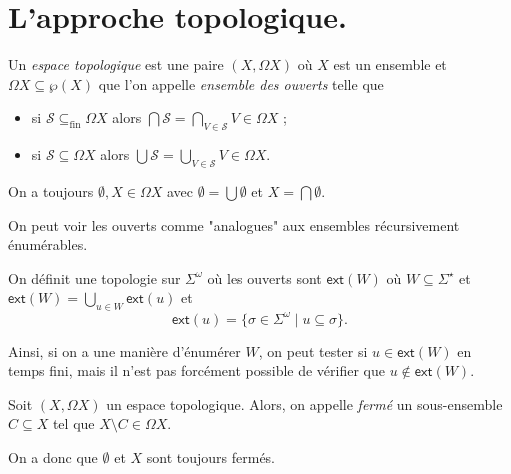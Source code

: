 \documentclass[./main]{subfiles}
\begin{document}
  \chapter{L'approche topologique.}

  \begin{defn}
    Un \textit{espace topologique} est une paire $(X, \Omega X)$ où $X$ est un ensemble et $\Omega X \subseteq \wp(X)$ que l'on appelle \textit{ensemble des ouverts} telle que
    \begin{itemize}
      \item si $\mathcal{S} \subseteq_\mathrm{fin} \Omega X$ alors $\bigcap \mathcal{S} = \bigcap_{V \in \mathcal{S}} V \in \Omega X$ ;
      \item si $\mathcal{S} \subseteq \Omega X$ alors $\bigcup \mathcal{S} = \bigcup_{V \in \mathcal{S}} V \in \Omega X$.
    \end{itemize}
  \end{defn}

  \begin{rmk}
    On a toujours $\emptyset, X \in \Omega X$ avec $\emptyset = \bigcup \emptyset$ et $X = \bigcap \emptyset$.
  \end{rmk}

  \begin{exm}
    On peut voir les ouverts comme "analogues" aux ensembles récursivement énumérables.

    On définit une topologie  sur $\Sigma^\omega$ où les ouverts sont  $\mathsf{ext}(W)$ où $W \subseteq \Sigma^\star$ et $\mathsf{ext}(W) = \bigcup_{u \in W} \mathsf{ext}(u)$ et 
    \[
    \mathsf{ext}(u) = \{\sigma \in \Sigma^\omega  \mid u \subseteq \sigma\} 
    .\]

    Ainsi, si on a une manière d'énumérer $W$, on peut tester si $u \in \mathsf{ext}(W)$ en temps fini, mais il n'est pas forcément possible de vérifier que $u \not\in \mathsf{ext}(W)$.
  \end{exm}

  \begin{defn}
    Soit $(X, \Omega X)$ un espace topologique.
    Alors, on appelle \textit{fermé} un sous-ensemble $C \subseteq X$ tel que $X \setminus C \in \Omega X$.
  \end{defn}

  \begin{rmk}
    On a donc que $\emptyset$ et $X$ sont toujours fermés.
  \end{rmk}
\end{document}

